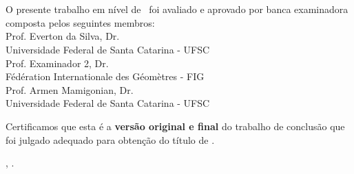 \documentclass[
	12pt,				%
	oneside,			%
	a4paper,			%
	chapter=TITLE,		%
	section=TITLE,		%
	english,			%
	brazil				%
	]{abntex2}
\begin{document}
\begin{folhadeaprovacao}
	\OnehalfSpacing
	\centering
	\imprimirautor\\%
	\vspace*{10pt}		
	\textbf{\imprimirtitulo}%
	\ifnotempty{\imprimirsubtitulo}{:~\imprimirsubtitulo}\\%
	\vspace*{\baselineskip}
	O presente trabalho em nível de \imprimirnivel~foi avaliado e aprovado por banca examinadora composta pelos seguintes membros:\\
	\vspace*{\baselineskip}
    Prof. Everton da Silva, Dr.\\
  Universidade Federal de Santa Catarina - UFSC\\
  \vspace*{\baselineskip}
    Prof. Examinador 2, Dr.\\
  Fédération Internationale des Géomètres - FIG\\
  \vspace*{\baselineskip}
    Prof. Armen Mamigonian, Dr.\\
  Universidade Federal de Santa Catarina - UFSC\\
  \vspace*{\baselineskip}
    
	\vspace*{2\baselineskip}
	\begin{minipage}{\textwidth}
		Certificamos que esta é a \textbf{versão original e final} do trabalho de conclusão que foi julgado adequado para obtenção do título de \imprimirformacao.\\
	\end{minipage}
	\vspace*{\fill}
	\vspace*{\fill}
	\assinatura{\OnehalfSpacing\imprimirorientador \\ \imprimirorientadorRotulo}
	\vspace*{\fill}
	\imprimirlocal, \imprimirano.
\end{folhadeaprovacao}
\end{document}

